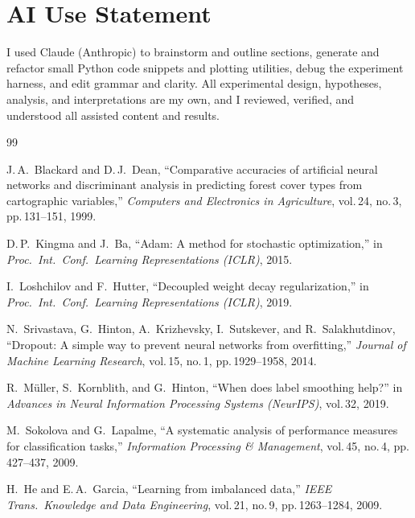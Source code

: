 \documentclass[letterpaper, 10pt, conference]{ieeeconf}
\begin{document}
\section*{AI Use Statement}
I used Claude (Anthropic) to brainstorm and outline sections, generate and
refactor small Python code snippets and plotting utilities, debug the experiment
harness, and edit grammar and clarity. All experimental design, hypotheses,
analysis, and interpretations are my own, and I reviewed, verified, and
understood all assisted content and results.

\begin{thebibliography}{99}
\small

J.\,A.\ Blackard and D.\,J.\ Dean, ``Comparative accuracies of artificial neural
networks and discriminant analysis in predicting forest cover types from
cartographic variables,'' \textit{Computers and Electronics in Agriculture},
vol.\,24, no.\,3, pp.\,131--151, 1999.

D.\,P.\ Kingma and J.\ Ba, ``Adam: A method for stochastic optimization,'' in
\textit{Proc.\ Int.\ Conf.\ Learning Representations (ICLR)}, 2015.

I.\ Loshchilov and F.\ Hutter, ``Decoupled weight decay regularization,'' in
\textit{Proc.\ Int.\ Conf.\ Learning Representations (ICLR)}, 2019.

N.\ Srivastava, G.\ Hinton, A.\ Krizhevsky, I.\ Sutskever, and R.\ Salakhutdinov,
``Dropout: A simple way to prevent neural networks from overfitting,''
\textit{Journal of Machine Learning Research}, vol.\,15, no.\,1, pp.\,1929--1958,
2014.

R.\ M\"uller, S.\ Kornblith, and G.\ Hinton, ``When does label smoothing help?''
in \textit{Advances in Neural Information Processing Systems (NeurIPS)}, vol.\,32,
2019.

M.\ Sokolova and G.\ Lapalme, ``A systematic analysis of performance measures for
classification tasks,'' \textit{Information Processing \& Management}, vol.\,45,
no.\,4, pp.\,427--437, 2009.

H.\ He and E.\,A.\ Garcia, ``Learning from imbalanced data,'' \textit{IEEE Trans.\
Knowledge and Data Engineering}, vol.\,21, no.\,9, pp.\,1263--1284, 2009.

\end{thebibliography}
\end{document}
